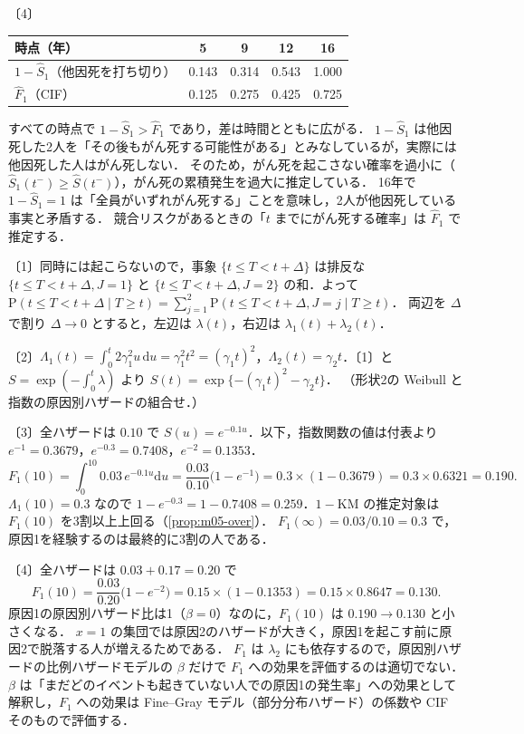 \documentclass[a4paper,11pt,openany]{ltjsbook}
\newenvironment{kaitou}[1]{%
  \par\medskip\noindent
  \begin{tcolorbox}[enhanced,breakable,colback=bkgray!3,colframe=bkgray!60,boxrule=0.4pt,
    left=4pt,right=4pt,top=2pt,bottom=2pt,arc=1pt,
    title={\cref{#1}の解答},fonttitle=\bfseries\small,coltitle=white,colbacktitle=bkgray!80]}%
  {\end{tcolorbox}\par}
\newcommand{\Prob}{\mathrm{P}}
\newcommand{\dd}{\mathrm{d}}
\begin{document}
\begin{kaitou}{reidai:m05-1}
〔4〕
\begin{center}\small
\begin{tabular}{@{}lcccc@{}}
\toprule
時点（年） & 5 & 9 & 12 & 16\\
\midrule
$1-\hat S_1$（他因死を打ち切り） & 0.143 & 0.314 & 0.543 & 1.000\\
$\hat F_1$（CIF） & 0.125 & 0.275 & 0.425 & 0.725\\
\bottomrule
\end{tabular}
\end{center}
すべての時点で $1-\hat S_1>\hat F_1$ であり，差は時間とともに広がる．
$1-\hat S_1$ は他因死した2人を「その後もがん死する可能性がある」とみなしているが，実際には他因死した人はがん死しない．
そのため，がん死を起こさない確率を過小に（$\hat S_1(t^-)\ge\hat S(t^-)$），がん死の累積発生を過大に推定している．
16年で $1-\hat S_1=1$ は「全員がいずれがん死する」ことを意味し，2人が他因死している事実と矛盾する．
競合リスクがあるときの「$t$ までにがん死する確率」は $\hat F_1$ で推定する．
\end{kaitou}

\begin{kaitou}{reidai:m05-2}
〔1〕同時には起こらないので，事象 $\{t\le T<t+\Delta\}$ は排反な $\{t\le T<t+\Delta,J=1\}$ と $\{t\le T<t+\Delta,J=2\}$ の和．よって
$\Prob(t\le T<t+\Delta\mid T\ge t)=\sum_{j=1}^2\Prob(t\le T<t+\Delta,J=j\mid T\ge t)$．
両辺を $\Delta$ で割り $\Delta\to0$ とすると，左辺は $\lambda(t)$，右辺は $\lambda_1(t)+\lambda_2(t)$．

〔2〕$\Lambda_1(t)=\int_0^t2\gamma_1^2u\,\dd u=\gamma_1^2t^2=(\gamma_1t)^2$，$\Lambda_2(t)=\gamma_2t$．〔1〕と $S=\exp(-\int_0^t\lambda)$ より
$S(t)=\exp\{-(\gamma_1t)^2-\gamma_2t\}$．
（形状2の Weibull と指数の原因別ハザードの組合せ．）

〔3〕全ハザードは $0.10$ で $S(u)=e^{-0.1u}$．以下，指数関数の値は付表より $e^{-1}=0.3679$，$e^{-0.3}=0.7408$，$e^{-2}=0.1353$．
\[
F_1(10)=\int_0^{10}0.03\,e^{-0.1u}\dd u=\frac{0.03}{0.10}\bigl(1-e^{-1}\bigr)=0.3\times(1-0.3679)=0.3\times0.6321=0.190 .
\]
$\Lambda_1(10)=0.3$ なので $1-e^{-0.3}=1-0.7408=0.259$．$1-\mathrm{KM}$ の推定対象は $F_1(10)$ を3割以上上回る（\cref{prop:m05-over}）．
$F_1(\infty)=0.03/0.10=0.3$ で，原因1を経験するのは最終的に3割の人である．

〔4〕全ハザードは $0.03+0.17=0.20$ で
\[
F_1(10)=\frac{0.03}{0.20}\bigl(1-e^{-2}\bigr)=0.15\times(1-0.1353)=0.15\times0.8647=0.130 .
\]
原因1の原因別ハザード比は1（$\beta=0$）なのに，$F_1(10)$ は $0.190\to0.130$ と小さくなる．
$x=1$ の集団では原因2のハザードが大きく，原因1を起こす前に原因2で脱落する人が増えるためである．
$F_1$ は $\lambda_2$ にも依存するので，原因別ハザードの比例ハザードモデルの $\beta$ だけで $F_1$ への効果を評価するのは適切でない．
$\beta$ は「まだどのイベントも起きていない人での原因1の発生率」への効果として解釈し，$F_1$ への効果は Fine--Gray モデル（部分分布ハザード）の係数や CIF そのもので評価する．
\end{kaitou}
\end{document}

